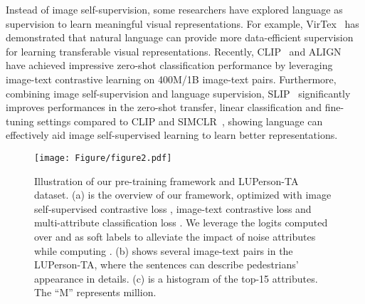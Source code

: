 \documentclass[final]{cvpr}
\begin{document}
Instead of image self-supervision, some researchers have explored language as supervision to learn meaningful visual representations.
For example, VirTex~\cite{desai2021virtex} has demonstrated that natural language can provide more data-efficient supervision for learning transferable visual representations.
Recently, CLIP~\cite{radford2021learning} and ALIGN~\cite{jia2021scaling} have achieved impressive zero-shot classification performance by leveraging image-text contrastive learning on 400M/1B image-text pairs.
Furthermore, combining image self-supervision and language supervision, SLIP~\cite{mu2022slip} significantly improves performances in the zero-shot transfer, linear classification and fine-tuning settings compared to CLIP and SIMCLR~\cite{chen2020simple}, showing language can effectively aid image self-supervised learning to learn better representations.



\begin{figure*}[t]
  \centering
  \texttt{[image: Figure/figure2.pdf]}
  \vspace{-7mm}
   \caption{Illustration of our pre-training framework and LUPerson-TA dataset.
    (a) is the overview of our framework, optimized with image self-supervised contrastive loss , image-text contrastive loss  and multi-attribute classification loss .
   We leverage the logits computed over  and  as soft labels to alleviate the impact of noise attributes while computing .
   (b) shows several image-text pairs in the LUPerson-TA, where the sentences can describe pedestrians' appearance in details.
   (c) is a histogram of the top-15 attributes. 
   The ``M'' represents million.
  }
   \label{fig2} 
  \vspace{-4mm}
\end{figure*}
\end{document}
